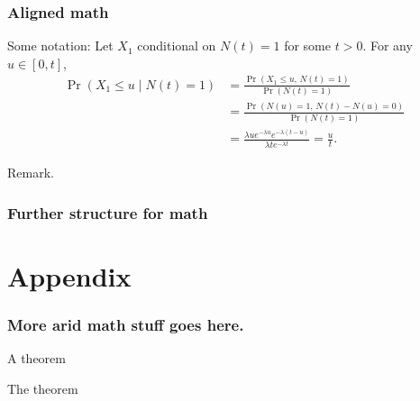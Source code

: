 \documentclass{beamer}
\begin{document}
\begin{frame}
    \frametitle{Aligned math}
        
    Some notation: Let $X_1$ conditional on $N(t) = 1$ for some $t > 0$. For any $u \in [0, t]$,
        \begin{align*}
        \Pr(X_1 \leq u \mid N(t) = 1)
        &= \frac{\Pr(X_1 \leq u,\, N(t) = 1)}{\Pr(N(t) = 1)} \\
        &= \frac{\Pr(N(u) = 1,\, N(t) - N(u) = 0)}{\Pr(N(t) = 1)} \\
        &= \frac{\lambda u e^{-\lambda u} e^{-\lambda (t - u)}}{\lambda t e^{-\lambda t}} = \frac{u}{t}.
        \end{align*}
        
        \vspace{1em}
        
        Remark.
        
\end{frame}

\begin{frame}
    \frametitle{Further structure for math}


\end{frame}


\section{Appendix}

\begin{frame}
    \frametitle{More arid math stuff goes here.}
    
    A theorem
    \begin{theorem}[Label]
        The theorem
    \end{theorem}

\end{frame}
\end{document}
